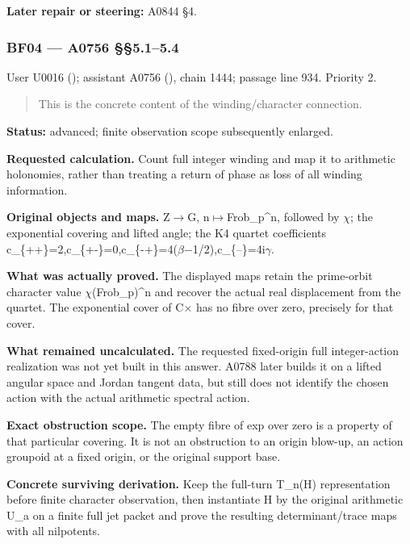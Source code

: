 \documentclass[10pt,a4paper,oneside]{report}
\begin{document}
\textbf{Later repair or steering:} A0844 §4.

\subsubsection{BF04 --- A0756 §§5.1--5.4}\label{bf04-a0756-5.15.4}

User U0016 (\protect{});
assistant A0756 (\protect{}),
chain 1444; passage line 934. Priority 2.

\begin{quote}
This is the concrete content of the winding/character connection.
\end{quote}

\textbf{Status:} advanced; finite observation scope subsequently
enlarged.

\textbf{Requested calculation.} Count full integer winding and map it to
arithmetic holonomies, rather than treating a return of phase as loss of
all winding information.

\textbf{Original objects and maps.}
Z\allowbreak{}\ensuremath{→}\allowbreak{}G,
n\allowbreak{}\ensuremath{↦}\allowbreak{}Frob\_p\textasciicircum{}n,
followed by \allowbreak{}\ensuremath{χ}\allowbreak{}; the exponential
covering and lifted angle; the K4 quartet coefficients
c\_\{++\}=2,c\_\{+-\}=0,c\_\{-+\}=4(\allowbreak{}\ensuremath{β}\allowbreak{}\allowbreak{}\ensuremath{−}\allowbreak{}1/2),c\_\{–\}=4i\allowbreak{}\ensuremath{γ}\allowbreak{}.

\textbf{What was actually proved.} The displayed maps retain the
prime-orbit character value
\allowbreak{}\ensuremath{χ}\allowbreak{}(Frob\_p)\textasciicircum{}n and
recover the actual real displacement from the quartet. The exponential
cover of C\allowbreak{}\ensuremath{×}\allowbreak{} has no fibre over
zero, precisely for that cover.

\textbf{What remained uncalculated.} The requested fixed-origin full
integer-action realization was not yet built in this answer. A0788 later
builds it on a lifted angular space and Jordan tangent data, but still
does not identify the chosen action with the actual arithmetic spectral
action.

\textbf{Exact obstruction scope.} The empty fibre of exp over zero is a
property of that particular covering. It is not an obstruction to an
origin blow-up, an action groupoid at a fixed origin, or the original
support base.

\textbf{Concrete surviving derivation.} Keep the full-turn T\_n(H)
representation before finite character observation, then instantiate H
by the original arithmetic U\_a on a finite full jet packet and prove
the resulting determinant/trace maps with all nilpotents.
\end{document}
